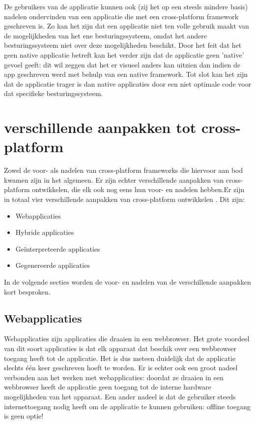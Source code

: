 De gebruikers van de applicatie kunnen ook (zij het op een steeds mindere basis) nadelen ondervinden van een applicatie die met een cross-platform framework geschreven is. Zo kan het zijn dat een applicatie niet ten volle gebruik maakt van de mogelijkheden van het ene besturingssysteem, omdat het andere besturingssysteem niet over deze mogelijkheden beschikt. Door het feit dat het geen native applicatie betreft kan het verder zijn dat de applicatie geen 'native' gevoel geeft: dit wil zeggen dat het er visueel anders kan uitzien dan indien de app geschreven werd met behulp van een native framework. Tot slot kan het zijn dat de applicatie trager is dan native applicaties door een niet optimale code voor dat specifieke besturingssysteem.

\section{verschillende aanpakken tot cross-platform}
 Zowel de voor- als nadelen van cross-platform frameworks die hiervoor aan bod kwamen zijn in het algemeen. Er zijn echter verschillende aanpakken van cross-platform ontwikkelen, die elk ook nog eens hun voor- en nadelen hebben.Er zijn in totaal vier verschillende aanpakken van cross-platform ontwikkelen \autocite{Xanthopoulos2013}. Dit zijn:
 
 \begin{itemize}
     \item Webapplicaties
     \item Hybride applicaties
     \item Geïnterpreteerde applicaties
     \item Gegenereerde applicaties
 \end{itemize}

In de volgende secties worden de voor- en nadelen van de verschillende aanpakken kort besproken.

\subsection{Webapplicaties}

Webapplicaties zijn applicaties die draaien in een webbrowser. Het grote voordeel van dit soort applicaties is dat elk apparaat dat beschik over een webbrowser toegang heeft tot de applicatie. Het is dus meteen duidelijk dat de applicatie slechts één keer geschreven hoeft te worden. Er is echter ook een groot nadeel verbonden aan het werken met webapplicaties: doordat ze draaien in een webbrowser heeft de applicatie geen toegang tot de interne hardware mogelijkheden van het apparaat. Een ander nadeel is dat de gebruiker steeds internettoegang nodig heeft om de applicatie te kunnen gebruiken: offline toegang is geen optie!

